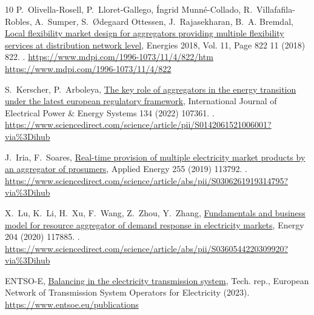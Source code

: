 \documentclass[preprint,12pt]{elsarticle}
\begin{document}
\begin{thebibliography}{10}
P.~Olivella-Rosell, P.~Lloret-Gallego, Íngrid Munné-Collado,
  R.~Villafafila-Robles, A.~Sumper, S.~Ødegaard Ottessen, J.~Rajasekharan,
  B.~A. Bremdal, \href{https://www.mdpi.com/1996-1073/11/4/822/htm
  https://www.mdpi.com/1996-1073/11/4/822}{Local flexibility market design for
  aggregators providing multiple flexibility services at distribution network
  level}, Energies 2018, Vol. 11, Page 822 11 (2018) 822.
\newblock \href {https://doi.org/10.3390/EN11040822}
  {}.
\newline\urlprefix\url{https://www.mdpi.com/1996-1073/11/4/822/htm
  https://www.mdpi.com/1996-1073/11/4/822}

S.~Kerscher, P.~Arboleya,
  \href{https://www.sciencedirect.com/science/article/pii/S0142061521006001?via%3Dihub}{The
  key role of aggregators in the energy transition under the latest european
  regulatory framework}, International Journal of Electrical Power \& Energy
  Systems 134 (2022) 107361.
\newblock \href {https://doi.org/10.1016/J.IJEPES.2021.107361}
  {}.
\newline\urlprefix\url{https://www.sciencedirect.com/science/article/pii/S0142061521006001?via%3Dihub}

J.~Iria, F.~Soares,
  \href{https://www.sciencedirect.com/science/article/abs/pii/S0306261919314795?via%3Dihub}{Real-time
  provision of multiple electricity market products by an aggregator of
  prosumers}, Applied Energy 255 (2019) 113792.
\newblock \href {https://doi.org/10.1016/J.APENERGY.2019.113792}
  {}.
\newline\urlprefix\url{https://www.sciencedirect.com/science/article/abs/pii/S0306261919314795?via%3Dihub}

X.~Lu, K.~Li, H.~Xu, F.~Wang, Z.~Zhou, Y.~Zhang,
  \href{https://www.sciencedirect.com/science/article/abs/pii/S0360544220309920?via%3Dihub}{Fundamentals
  and business model for resource aggregator of demand response in electricity
  markets}, Energy 204 (2020) 117885.
\newblock \href {https://doi.org/10.1016/J.ENERGY.2020.117885}
  {}.
\newline\urlprefix\url{https://www.sciencedirect.com/science/article/abs/pii/S0360544220309920?via%3Dihub}

{ENTSO-E}, \href{https://www.entsoe.eu/publications}{Balancing in the
  electricity transmission system}, Tech. rep., European Network of
  Transmission System Operators for Electricity (2023).
\newline\urlprefix\url{https://www.entsoe.eu/publications}


\end{thebibliography}
\end{document}
